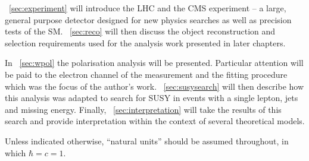\chap~\ref{sec:experiment} will introduce the \ac{LHC} and the \ac{CMS}
experiment -- a large, general purpose detector designed for new physics
searches as well as precision tests of the \ac{SM}. \chap~\ref{sec:reco} will
then discuss the object reconstruction and selection requirements used for the
analysis work presented in later chapters.

In \chap~\ref{sec:wpol} the \PW polarisation analysis will be
presented. Particular attention will be paid to the electron channel of the
measurement and the fitting procedure which was the focus of the author's
work. \chap~\ref{sec:susysearch} will then describe how this analysis was
adapted to search for \ac{SUSY} in events with a single lepton, jets and missing
energy. Finally, \chap~\ref{sec:interpretation} will take the results of this
search and provide interpretation within the context of several theoretical
models.

Unless indicated otherwise, ``natural units'' should be assumed throughout, in
which $\hbar = c = 1$.
